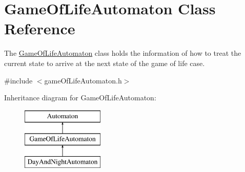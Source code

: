 \hypertarget{class_game_of_life_automaton}{}\section{Game\+Of\+Life\+Automaton Class Reference}
\label{class_game_of_life_automaton}


The \mbox{\hyperlink{class_game_of_life_automaton}{Game\+Of\+Life\+Automaton}} class holds the information of how to treat the current state to arrive at the next state of the game of life case.  




{\ttfamily \#include $<$game\+Of\+Life\+Automaton.\+h$>$}

Inheritance diagram for Game\+Of\+Life\+Automaton\+:\begin{figure}[H]
\begin{center}
\leavevmode
\includegraphics[height=3.000000cm]{class_game_of_life_automaton}
\end{center}
\end{figure}
